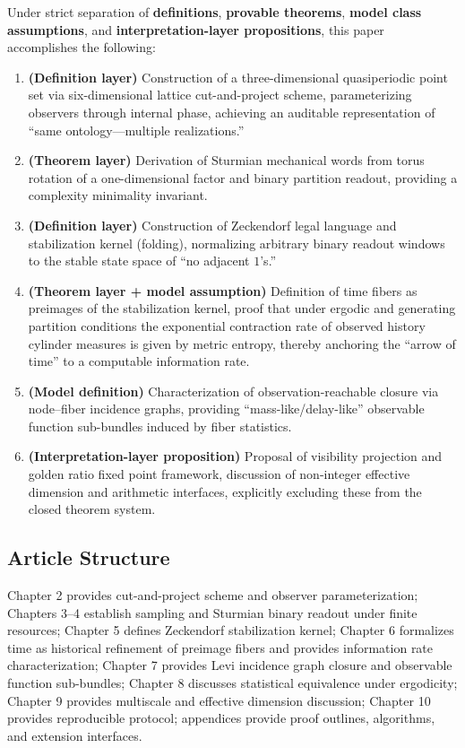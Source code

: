 Under strict separation of \textbf{definitions}, \textbf{provable theorems}, \textbf{model class assumptions}, and \textbf{interpretation-layer propositions}, this paper accomplishes the following:
\begin{enumerate}
  \item \textbf{(Definition layer)} Construction of a three-dimensional quasiperiodic point set via six-dimensional lattice cut-and-project scheme, parameterizing observers through internal phase, achieving an auditable representation of ``same ontology—multiple realizations.''
  \item \textbf{(Theorem layer)} Derivation of Sturmian mechanical words from torus rotation of a one-dimensional factor and binary partition readout, providing a complexity minimality invariant.
  \item \textbf{(Definition layer)} Construction of Zeckendorf legal language and stabilization kernel (folding), normalizing arbitrary binary readout windows to the stable state space of ``no adjacent $1$'s.''
  \item \textbf{(Theorem layer + model assumption)} Definition of time fibers as preimages of the stabilization kernel, proof that under ergodic and generating partition conditions the exponential contraction rate of observed history cylinder measures is given by metric entropy, thereby anchoring the ``arrow of time'' to a computable information rate.
  \item \textbf{(Model definition)} Characterization of observation-reachable closure via node--fiber incidence graphs, providing ``mass-like/delay-like'' observable function sub-bundles induced by fiber statistics.
  \item \textbf{(Interpretation-layer proposition)} Proposal of visibility projection and golden ratio fixed point framework, discussion of non-integer effective dimension and arithmetic interfaces, explicitly excluding these from the closed theorem system.
\end{enumerate}

\subsection{Article Structure}

Chapter 2 provides cut-and-project scheme and observer parameterization; Chapters 3--4 establish sampling and Sturmian binary readout under finite resources; Chapter 5 defines Zeckendorf stabilization kernel; Chapter 6 formalizes time as historical refinement of preimage fibers and provides information rate characterization; Chapter 7 provides Levi incidence graph closure and observable function sub-bundles; Chapter 8 discusses statistical equivalence under ergodicity; Chapter 9 provides multiscale and effective dimension discussion; Chapter 10 provides reproducible protocol; appendices provide proof outlines, algorithms, and extension interfaces.
